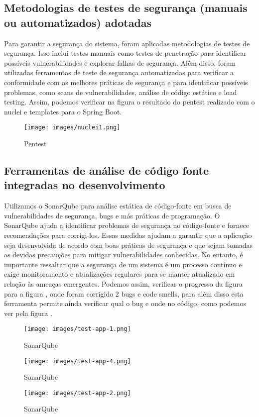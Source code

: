 \documentclass[conference]{IEEEtran}
\begin{document}
\subsection{Metodologias de testes de segurança (manuais ou automatizados) adotadas} 
Para garantir a segurança do sistema, foram aplicadas metodologias de testes de segurança. Isso inclui testes manuais como testes de penetração para identificar possíveis vulnerabilidades e explorar falhas de segurança. Além disso, foram utilizadas ferramentas de teste de segurança automatizadas para verificar a conformidade com as melhores práticas de segurança e para identificar possíveis problemas, como scans de vulnerabilidades, análise de código estático e load testing.
Assim, podemos verificar na figura \cite{3} o resultado do pentest realizado com o nuclei e templates para o Spring Boot.
\begin{figure}[H]
    \centering
    \texttt{[image: images/nuclei1.png]}
    \caption{Pentest \cite{3}}
    \label{fig:Pentest}
\end{figure}




\subsection{Ferramentas de análise de código fonte integradas no desenvolvimento}
Utilizamos o SonarQube para análise estática de código-fonte em busca de vulnerabilidades de segurança, bugs e más práticas de programação. O SonarQube ajuda a identificar problemas de segurança no código-fonte e fornece recomendações para corrigi-los.
Essas medidas ajudam a garantir que a aplicação seja desenvolvida de acordo com boas práticas de segurança e que sejam tomadas as devidas precauções para mitigar vulnerabilidades conhecidas. No entanto, é importante ressaltar que a segurança de um sistema é um processo contínuo e exige monitoramento e atualizações regulares para se manter atualizado em relação às ameaças emergentes.
Podemos assim, verificar o progresso da figura \cite{4} para a figura \cite{5}, onde foram corrigido 2 bugs e code smells, para além disso esta ferramenta permite ainda verificar qual o bug e onde no código, como podemos ver pela figura \cite{6}.
\begin{figure}[H]
    \centering
    \texttt{[image: images/test-app-1.png]}
    \caption{SonarQube \cite{4}}
    \label{fig:SonarQube}
\end{figure}
\begin{figure}[H]
    \centering
    \texttt{[image: images/test-app-4.png]}
    \caption{SonarQube \cite{5}}
    \label{fig:SonarQube}
\end{figure}
\begin{figure}[H]
    \centering
    \texttt{[image: images/test-app-2.png]}
    \caption{SonarQube \cite{6}}
    \label{fig:SonarQube}
\end{figure}
\end{document}
